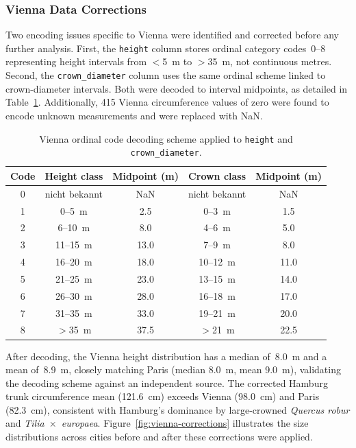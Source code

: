 \subsubsection{Vienna Data Corrections}
\label{sec:vienna-corrections}
Two encoding issues specific to Vienna were identified and corrected before any further analysis. First, the \texttt{height} column stores ordinal category codes~0--8 representing height intervals from $<$5~m to $>$35~m, not continuous metres. Second, the \texttt{crown\_diameter} column uses the same ordinal scheme linked to crown-diameter intervals. Both were decoded to interval midpoints, as detailed in Table~\ref{tab:vienna-decode}. Additionally, 415 Vienna circumference values of zero were found to encode unknown measurements and were replaced with NaN.

\begin{table}[htbp]
\centering
\caption{Vienna ordinal code decoding scheme applied to \texttt{height} and
\texttt{crown\_diameter}.}
\label{tab:vienna-decode}
\begin{tabular}{ccccc}
\hline
\textbf{Code} & \textbf{Height class} & \textbf{Midpoint (m)} &
\textbf{Crown class} & \textbf{Midpoint (m)} \\
\hline
0 & nicht bekannt & NaN   & nicht bekannt & NaN  \\
1 & 0--5~m        & 2.5   & 0--3~m        & 1.5  \\
2 & 6--10~m       & 8.0   & 4--6~m        & 5.0  \\
3 & 11--15~m      & 13.0  & 7--9~m        & 8.0  \\
4 & 16--20~m      & 18.0  & 10--12~m      & 11.0 \\
5 & 21--25~m      & 23.0  & 13--15~m      & 14.0 \\
6 & 26--30~m      & 28.0  & 16--18~m      & 17.0 \\
7 & 31--35~m      & 33.0  & 19--21~m      & 20.0 \\
8 & $>$35~m       & 37.5  & $>$21~m       & 22.5 \\
\hline
\end{tabular}
\end{table}

After decoding, the Vienna height distribution has a median of~8.0~m and a mean of~8.9~m, closely matching Paris (median 8.0~m, mean 9.0~m), validating the decoding scheme against an independent source. The corrected Hamburg trunk circumference mean (121.6~cm) exceeds Vienna (98.0~cm) and Paris (82.3~cm), consistent with Hamburg's dominance by large-crowned \textit{Quercus robur} and \textit{Tilia~$\times$~europaea}. Figure~\ref{fig:vienna-corrections} illustrates the size distributions across cities before and after these corrections were applied.


